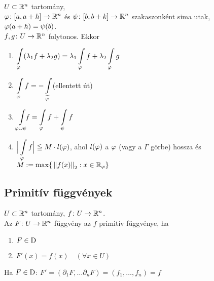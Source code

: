 \begin{te}
  $U\subset \mathbb{R}^n$ tartomány,\\$\varphi\colon [a,a+h]\to\mathbb{R}^n$ és $\psi\colon [b,b+k]\to\mathbb{R}^n$ szakaszonként sima utak,
  $\varphi(a+h) = \psi(b)$.\\$f,g\colon U\to\mathbb{R}^n$ folytonos. Ekkor
  \begin{enumerate}
  \item $\di\Int_\vfi(\lambda_1 f +\lambda_2g) = \lambda_1\Int_\vfi f+ \lambda_2\Int_\vfi g$
  \item $\di\Int_\vfi f = -\Int_{\widetilde{\vfi}}$\qquad (ellentett út)
  \item $\di\Int_{\vfi\cup\psi}\!\!\! f = \Int_\vfi f + \Int_\psi f$
  \item $\di\Big\vert \Int_\vfi f\Big\vert \leqq M\cdot l(\vfi)$, ahol $l(\varphi)$ a $\varphi$ (vagy a $\Gamma$ görbe)
  hossza és $M:= \max \{\,\left\Vert f(x)\right\Vert_2:x\in\mathbb{R}_\varphi\}$
  \end{enumerate}
\end{te}

\subsection{Primitív függvények}
\begin{de}$U\subset\mathbb{R}^n$ tartomány, $f\colon U\to\mathbb{R}^n$.\\
  Az $F\colon U\to\mathbb{R}^n$ függvény az $f$ primitív függvénye, ha
  {\listazjromai
    \begin{enumerate}
    \item $F\in\operatorname{D}$
    \item $F'(x) = f(x)\quad (\forall x\in U)$
    \end{enumerate}
  }
\end{de}

\begin{megj}
  Ha $F\in\operatorname{D}$: $F'=(\partial_1F,\dotsc\partial_nF) =(f_1,\dotsc,f_n)=f$ 
\end{megj}

